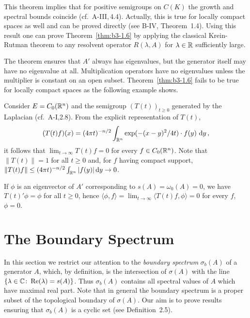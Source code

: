 This theorem implies that for positive semigroups on $C(K)$ the growth and spectral bounds coincide (cf.\ A-III,\,4.4).
Actually, this is true for locally compact spaces as well and can be proved directly (see B-IV, Theorem~1.4).
Using this result one can prove Theorem~\ref{thm:b3-1.6} by applying the classical Krein-Rutman theorem to any resolvent operator $R(\lambda,A)$ for $\lambda \in \mathbb{R}$ sufficiently large.

The theorem ensures that $A'$ always has eigenvalues, but the generator itself may have no eigenvalue at all.
Multiplication operators have no eigenvalues unless the multiplier is constant on an open subset.
Theorem~\ref{thm:b3-1.6} fails to be true for locally compact spaces as the following example shows.
\begin{example}\label{ex:b3-1.7}
	Consider $E = C_{0}(\mathbb{R}^{n})$ and the semigroup $(T(t))_{t \geq 0}$ generated by the Laplacian (cf.\ A-I,2.8).
From the explicit representation of $T(t)$,
	\begin{equation}\label{eq:b3-1.17}
		(T(t)f)(x) = (4\pi t)^{-n/2}\int_{\mathbb{R}^{n}} \exp(-(x-y)^{2}/4t)\cdot f(y) \, \mathop{}\!\mathrm{d}{y} \,,
	\end{equation}
	it follows that $\lim_{t \to \infty}T(t)f = 0$ for every $f \in C_{0}(\mathbb{R}^{n})$. Note that $\|T(t)\| = 1$ for all $t \geq 0$ and, for $f$ having compact support,      
    $\|T(t)f\| \leq (4\pi t)^{-n/2}\int_{\mathbb{R}^{n}} |f(y)| \mathop{}\!\mathrm{d}{y} \to 0$. 
    	
	If $\phi$ is an eigenvector of $A'$ corresponding to $s(A) = \omega_{0}(A) = 0$, we have $T(t)'\phi = \phi$ for all $t \geq 0$, hence $\langle \phi,f \rangle = \lim_{t \to \infty}\langle T(t)f,\phi \rangle = 0$ for every $f$, \ie $\phi = 0$.
\end{example}
\section{The Boundary Spectrum}\label{sec:b3-2}%
In this section we restrict our attention to the \emph{boundary spectrum} $\sigma_{b}(A)$ of a generator $A$, which, by definition, is the intersection of $\sigma(A)$ with the line $\{\lambda \in \mathbb{C} \colon \mathop{}\!\mathrm{Re}(\lambda) = s(A)\}$.
Thus $\sigma_{b}(A)$ contains all spectral values of $A$ which have maximal real part.
Note that in general the boundary spectrum is a proper subset of the topological boundary of $\sigma(A)$.
Our aim is to prove results ensuring that $\sigma_{b}(A)$ is a cyclic set (see Definition~2.5).

